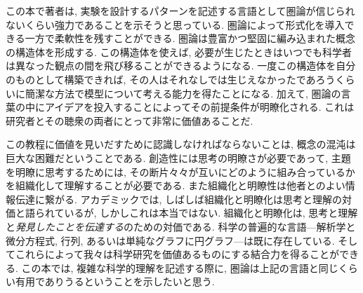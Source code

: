 この本で著者は, 実験を設計するパターンを記述する言語として圏論が信じられないくらい強力であることを示そうと思っている. 圏論によって形式化を導入できる一方で柔軟性を残すことができる. 圏論は豊富かつ堅固に編み込まれた概念の構造体を形成する. この構造体を使えば, 必要が生じたときはいつでも科学者は異なった観点の間を飛び移ることができるようになる. 一度この構造体を自分のものとして構築できれば, その人はそれなしでは生じえなかったであろうくらいに簡潔な方法で模型について考える能力を得たことになる. 加えて, 圏論の言葉の中にアイデアを投入することによってその前提条件が明瞭化される. これは研究者とその聴衆の両者にとって非常に価値あることだ. 


この教程に価値を見いだすために認識しなければならないことは, 概念の混沌は巨大な困難だということである. 創造性には思考の明瞭さが必要であって, 主題を明瞭に思考するためには, その断片々々が互いにどのように組み合っているかを組織化して理解することが必要である. また組織化と明瞭性は他者とのよい情報伝達に繋がる. アカデミックでは, しばしば組織化と明瞭化は思考と理解の対価と語られているが, しかしこれは本当ではない. 組織化と明瞭化は, 思考と理解と\emph{発見したことを伝達する}のための対価である. 科学の普遍的な言語---解析学と微分方程式, 行列, あるいは単純なグラフに円グラフ---は既に存在している. そしてこれらによって我々は科学研究を価値あるものにする結合力を得ることができる. この本では, 複雑な科学的理解を記述する際に, 圏論は上記の言語と同じくらい有用でありうるということを示したいと思う.



